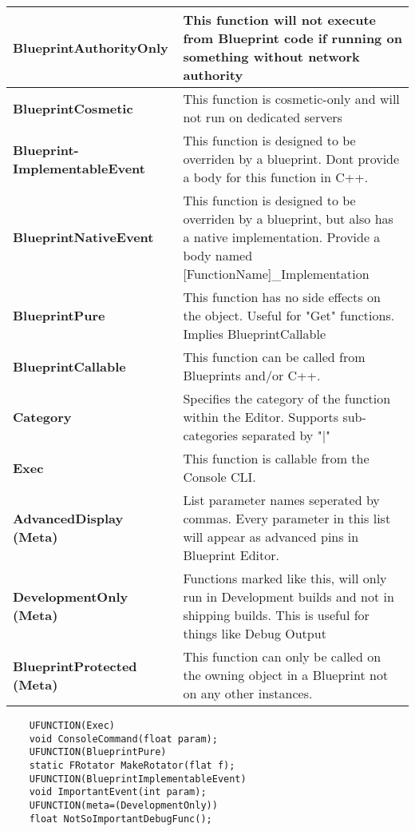 \documentclass[10pt,a4paper]{article}
\begin{document}
\begin{multicols*}{2}
\begin{tabularx}{\columnwidth}{|p{4.1cm}|X|}
		\hline \textbf{BlueprintAuthorityOnly}
		& This function will not execute from Blueprint code if running on something without network authority \\
		\hline \textbf{BlueprintCosmetic}
		& This function is cosmetic-only and will not run on dedicated servers \\
		\hline \textbf{Blueprint-ImplementableEvent}
		& This function is designed to be overriden by a blueprint. Dont provide a body for this function in C++. \\
		\hline \textbf{BlueprintNativeEvent}
		& This function is designed to be overriden by a blueprint, but also has a native implementation. Provide a body named [FunctionName]\_Implementation \\
		\hline \textbf{BlueprintPure}
		& This function has no side effects on the object. Useful for "Get" functions. Implies BlueprintCallable \\
		\hline \textbf{BlueprintCallable}
		& This function can be called from Blueprints and/or C++. \\
		\hline \textbf{Category}
		& Specifies the category of the function within the Editor. Supports sub-categories separated by "$\vert$" \\
		\hline \textbf{Exec}
		& This function is callable from the Console CLI. \\	
		\hline \textbf{AdvancedDisplay (Meta)}
		& List parameter names seperated by commas. Every parameter in this list will appear as advanced pins in Blueprint Editor. \\
		\hline \textbf{DevelopmentOnly (Meta)}
		& Functions marked like this, will only run in Development builds and not in shipping builds. This is useful for things like Debug Output\\
		\hline \textbf{BlueprintProtected (Meta)}
		& This function can only be called on the owning object in a Blueprint not on any other instances. \\
		\hline
		
	\end{tabularx}
	
	\begin{verbatim}
	UFUNCTION(Exec)
	void ConsoleCommand(float param);
	UFUNCTION(BlueprintPure)
	static FRotator MakeRotator(flat f);
	UFUNCTION(BlueprintImplementableEvent)
	void ImportantEvent(int param);
	UFUNCTION(meta=(DevelopmentOnly))
	float NotSoImportantDebugFunc();
	\end{verbatim}
	

\end{multicols*}
\end{document}

